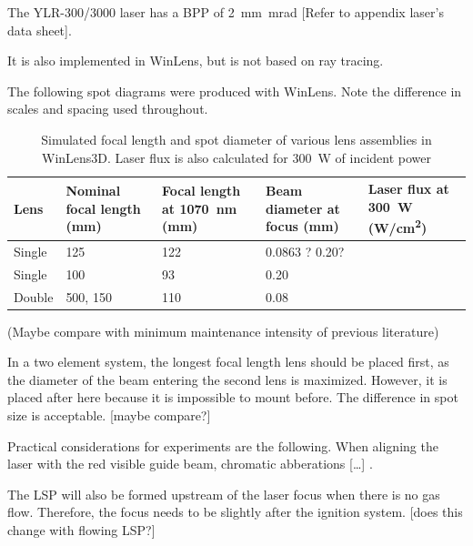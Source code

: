         The YLR-300/3000 laser has a BPP of \qty{2}{mm.mrad} [Refer to appendix laser's data sheet].
        
        It is also implemented in WinLens, but is not based on ray tracing.

        The following spot diagrams were produced with WinLens. Note the difference in scales and spacing used throughout.



        \begin{table}[!ht]
            \centering
            \caption{Simulated focal length and spot diameter of various lens assemblies in WinLens3D. Laser flux is also calculated for \qty{300}{W} of incident power}
            \label{tab:laser flux}
            \begin{tabularx}{\textwidth}{@{}lX<{\raggedright}X<{\raggedright}X<{\raggedright}X<{\raggedright}@{}}
            \toprule
            Lens & Nominal focal length (\unit{mm}) & Focal length at \qty{1070}{nm} (\unit{mm})& Beam diameter at focus (\unit{mm}) & Laser flux at \qty{300}{W} (\unit{W/cm^2}) \\ \midrule
            Single & 125           &  122   &    0.0863 ?  0.20?     &  \\
            Single & 100           &  93   &    0.20   &  \\
            Double & 500, 150      &  110    &    0.08   &  \\
            \bottomrule
            \end{tabularx}
        \end{table}

        (Maybe compare with minimum maintenance intensity of previous literature)

        In a two element system, the longest focal length lens should be placed first, as the diameter of the beam entering the second lens is maximized. However, it is placed after here because it is impossible to mount before. The difference in spot size is acceptable. [maybe compare?]

        Practical considerations for experiments are the following. When aligning the laser with the red visible guide beam, chromatic abberations [\dots] \cite{hechtUnderstandingLasersEntry2019}.

        The LSP will also be formed upstream of the laser focus when there is no gas flow. Therefore, the focus needs to be slightly after the ignition system. [does this change with flowing LSP?]

